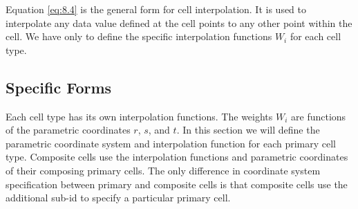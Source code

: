 Equation \ref{eq:8.4} is the general form for cell interpolation. It is used to interpolate any data value defined at the cell points to any other point within the cell. We have only to define the specific interpolation functions $W_i$ for each cell type.

\subsection{Specific Forms}

Each cell type has its own interpolation functions. The weights $W_i$ are functions of the parametric coordinates $r$, $s$, and $t$. In this section we will define the parametric coordinate system and interpolation function for each primary cell type. Composite cells use the interpolation functions and parametric coordinates of their composing primary cells. The only difference in coordinate system specification between primary and composite cells is that composite cells use the additional sub-id to specify a particular primary cell.

